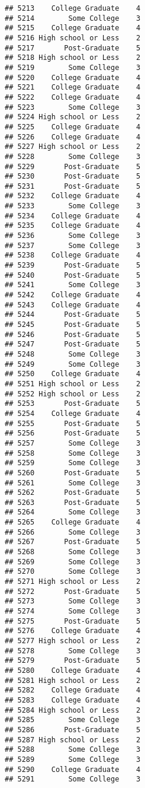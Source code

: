 \documentclass[
]{article}
\begin{document}
\begin{verbatim}
## 5213    College Graduate    4
## 5214        Some College    3
## 5215    College Graduate    4
## 5216 High school or Less    2
## 5217       Post-Graduate    5
## 5218 High school or Less    2
## 5219        Some College    3
## 5220    College Graduate    4
## 5221    College Graduate    4
## 5222    College Graduate    4
## 5223        Some College    3
## 5224 High school or Less    2
## 5225    College Graduate    4
## 5226    College Graduate    4
## 5227 High school or Less    2
## 5228        Some College    3
## 5229       Post-Graduate    5
## 5230       Post-Graduate    5
## 5231       Post-Graduate    5
## 5232    College Graduate    4
## 5233        Some College    3
## 5234    College Graduate    4
## 5235    College Graduate    4
## 5236        Some College    3
## 5237        Some College    3
## 5238    College Graduate    4
## 5239       Post-Graduate    5
## 5240       Post-Graduate    5
## 5241        Some College    3
## 5242    College Graduate    4
## 5243    College Graduate    4
## 5244       Post-Graduate    5
## 5245       Post-Graduate    5
## 5246       Post-Graduate    5
## 5247       Post-Graduate    5
## 5248        Some College    3
## 5249        Some College    3
## 5250    College Graduate    4
## 5251 High school or Less    2
## 5252 High school or Less    2
## 5253       Post-Graduate    5
## 5254    College Graduate    4
## 5255       Post-Graduate    5
## 5256       Post-Graduate    5
## 5257        Some College    3
## 5258        Some College    3
## 5259        Some College    3
## 5260       Post-Graduate    5
## 5261        Some College    3
## 5262       Post-Graduate    5
## 5263       Post-Graduate    5
## 5264        Some College    3
## 5265    College Graduate    4
## 5266        Some College    3
## 5267       Post-Graduate    5
## 5268        Some College    3
## 5269        Some College    3
## 5270        Some College    3
## 5271 High school or Less    2
## 5272       Post-Graduate    5
## 5273        Some College    3
## 5274        Some College    3
## 5275       Post-Graduate    5
## 5276    College Graduate    4
## 5277 High school or Less    2
## 5278        Some College    3
## 5279       Post-Graduate    5
## 5280    College Graduate    4
## 5281 High school or Less    2
## 5282    College Graduate    4
## 5283    College Graduate    4
## 5284 High school or Less    2
## 5285        Some College    3
## 5286       Post-Graduate    5
## 5287 High school or Less    2
## 5288        Some College    3
## 5289        Some College    3
## 5290    College Graduate    4
## 5291        Some College    3

\end{verbatim}
\end{document}
